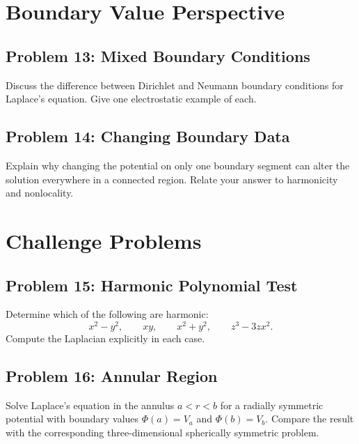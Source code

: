 \documentclass[hidelinks]{article}
\begin{document}
\section{Boundary Value Perspective}
\subsection{Problem 13: Mixed Boundary Conditions}
Discuss the difference between Dirichlet and Neumann boundary conditions for Laplace's equation. Give one electrostatic example of each.

\subsection{Problem 14: Changing Boundary Data}
Explain why changing the potential on only one boundary segment can alter the solution everywhere in a connected region. Relate your answer to harmonicity and nonlocality.

\section{Challenge Problems}
\subsection{Problem 15: Harmonic Polynomial Test}
Determine which of the following are harmonic:
\[
x^2-y^2,\qquad xy,\qquad x^2+y^2,\qquad z^3-3zx^2.
\]
Compute the Laplacian explicitly in each case.

\subsection{Problem 16: Annular Region}
Solve Laplace's equation in the annulus $a<r<b$ for a radially symmetric potential with boundary values $\Phi(a)=V_a$ and $\Phi(b)=V_b$. Compare the result with the corresponding three-dimensional spherically symmetric problem.
\end{document}
